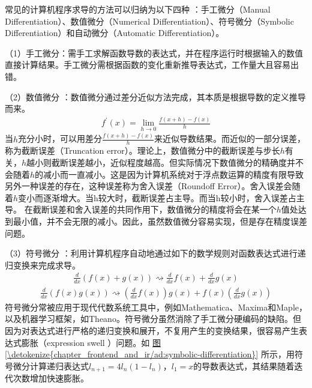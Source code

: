 \documentclass[letterpaper,10pt,english]{sphinxmanual}
\begin{document}
\sphinxAtStartPar
常见的计算机程序求导的方法可以归纳为以下四种
：手工微分（Manual
Differentiation）、数值微分（Numerical
Differentiation）、符号微分（Symbolic
Differentiation）和自动微分（Automatic Differentiation）。

\sphinxAtStartPar
（1）手工微分：需手工求解函数导数的表达式，并在程序运行时根据输入的数值直接计算结果。手工微分需根据函数的变化重新推导表达式，工作量大且容易出错。

\sphinxAtStartPar
（2）数值微分
：数值微分通过差分近似方法完成，其本质是根据导数的定义推导而来。
\begin{equation}\label{equation:chapter_frontend_and_ir/ad:chapter_frontend_and_ir/ad:0}
\begin{split}f^{'}(x)=\lim_{h \to 0}\frac{f(x+h)-f(x)}{h}\end{split}
\end{equation}
\sphinxAtStartPar
当\(h\)充分小时，可以用差分\(\frac{f(x+h)-f(x)}{h}\)来近似导数结果。而近似的一部分误差，称为截断误差（Truncation
error）。理论上，数值微分中的截断误差与步长\(h\)有关，\(h\)越小则截断误差越小，近似程度越高。但实际情况下数值微分的精确度并不会随着\(h\)的减小而一直减小。这是因为计算机系统对于浮点数运算的精度有限导致另外一种误差的存在，这种误差称为舍入误差（Round\sphinxhyphen{}off
Error）。舍入误差会随着\(h\)变小而逐渐增大。当h较大时，截断误差占主导。而当h较小时，舍入误差占主导。
在截断误差和舍入误差的共同作用下，数值微分的精度将会在某一个\(h\)值处达到最小值，并不会无限的减小。因此，虽然数值微分容易实现，但是存在精度误差问题。

\sphinxAtStartPar
（3）符号微分
：利用计算机程序自动地通过如下的数学规则对函数表达式进行递归变换来完成求导。
\begin{equation}\label{equation:chapter_frontend_and_ir/ad:chapter_frontend_and_ir/ad:1}
\begin{split}\frac{d}{dx}(f(x)+g(x))\rightsquigarrow\frac{d}{dx}f(x)+\frac{d}{dx}g(x)\end{split}
\end{equation}\begin{equation}\label{equation:chapter_frontend_and_ir/ad:chapter_frontend_and_ir/ad:2}
\begin{split}\frac{d}{dx}(f(x)g(x))\rightsquigarrow(\frac{d}{dx}f(x))g(x)+f(x)(\frac{d}{dx}g(x))\end{split}
\end{equation}
\sphinxAtStartPar
符号微分常被应用于现代代数系统工具中，例如Mathematica、Maxima和Maple，以及机器学习框架，如Theano。符号微分虽然消除了手工微分硬编码的缺陷。但因为对表达式进行严格的递归变换和展开，不复用产生的变换结果，很容易产生表达式膨胀（expression
swell  ）问题。如
\hyperref[\detokenize{chapter_frontend_and_ir/ad:symbolic-differentiation}]{图\ref{\detokenize{chapter_frontend_and_ir/ad:symbolic-differentiation}}}
所示，用符号微分计算递归表达式\(l_{n+1}=4l_n(1-l_n)\)，\(l_1=x\)的导数表达式，其结果随着迭代次数增加快速膨胀。
\end{document}
